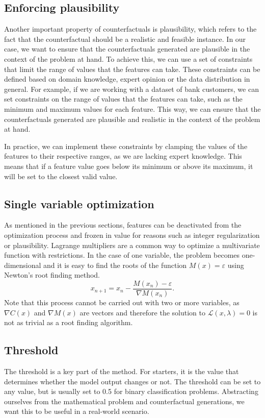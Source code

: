 \documentclass[12pt]{extarticle}
\numberwithin{equation}{section}
\begin{document}
\subsection{Enforcing plausibility}\label{sec:enforcing_plausibility}
Another important property of counterfactuals is plausibility, which refers to the fact that the counterfactual should be a realistic and feasible instance. In our case, we want to ensure that the counterfactuals generated are plausible in the context of the problem at hand. To achieve this, we can use a set of constraints that limit the range of values that the features can take. These constraints can be defined based on domain knowledge, expert opinion or the data distribution in general. For example, if we are working with a dataset of bank customers, we can set constraints on the range of values that the features can take, such as the minimum and maximum values for each feature. This way, we can ensure that the counterfactuals generated are plausible and realistic in the context of the problem at hand.

In practice, we can implement these constraints by clamping the values of the features to their respective ranges, as we are lacking expert knowledge. This means that if a feature value goes below its minimum or above its maximum, it will be set to the closest valid value. 

\subsection{Single variable optimization}\label{sec:single}
As mentioned in the previous sections, features can be deactivated from the optimization process and frozen in value for reasons such as integer regularization or plausibility. Lagrange multipliers are a common way to optimize a multivariate function with restrictions. In the case of one variable, the problem becomes one-dimensional and it is easy to find the roots of the function $M(x) = \varepsilon$ using Newton's root finding method.
\begin{equation}
    x_{n+1} = x_n - \frac{M(x_n) - \varepsilon}{\nabla M(x_n)}.
\end{equation}
Note that this process cannot be carried out with two or more variables, as $\nabla C(x)$ and $\nabla M(x)$ are vectors and therefore the solution to $\mathcal{L}(x, \lambda) = 0$ is not as trivial as a root finding algorithm.

\subsection{Threshold}\label{sec:threshold}
The threshold is a key part of the method. For starters, it is the value that determines whether the model output changes or not. The threshold can be set to any value, but is usually set to 0.5 for binary classification problems. Abstracting ourselves from the mathematical problem and counterfactual generations, we want this to be useful in a real-world scenario. 
\end{document}
